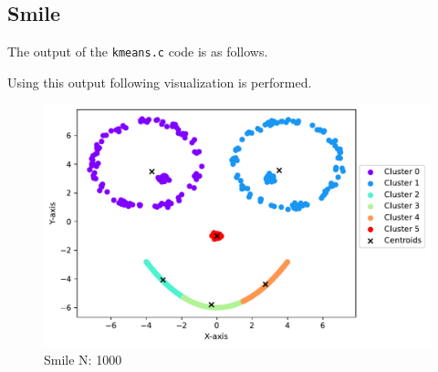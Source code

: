 \subsection{Smile}
The output of the \texttt{kmeans.c} code is as follows.


Using this output following visualization is performed.
\begin{figure}[H]
    \centering
    \includegraphics[width=.8\textwidth]{figures/smile.pdf}
    \caption{Smile N: 1000}
    \label{smile}
\end{figure}



